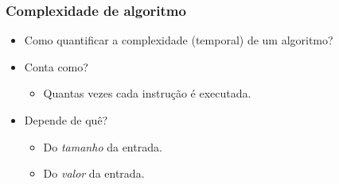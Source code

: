 \documentclass{beamer}
\begin{document}
\begin{frame}
\frametitle{Complexidade de algoritmo}

\begin{itemize}
\item Como quantificar a complexidade (temporal) de um algoritmo?
\item Conta como?

\pause
\begin{itemize}
  \item Quantas vezes cada instrução é executada.
\end{itemize}

\item Depende de quê?

\pause
\begin{itemize}
\item Do \emph{tamanho\/} da entrada.
\item Do \emph{valor\/} da entrada.
\end{itemize}
\end{itemize}

\end{frame}
\end{document}
